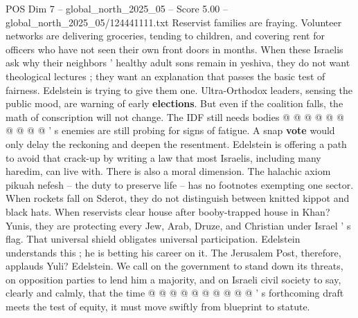 \begin{textsample}{POS Dim 7 – global\_north\_2025\_05 – Score 5.00 – global\_north\_2025\_05/124441111.txt}
Reservist families are fraying.
Volunteer networks are delivering groceries, tending to children, and covering rent for officers who have not seen their own front doors in months.
When these Israelis ask why their neighbors ' healthy adult sons remain in yeshiva, they do not want theological lectures ; they want an explanation that passes the basic test of fairness.
Edelstein is trying to give them one.
Ultra-Orthodox leaders, sensing the public mood, are warning of early \textbf{elections}.
But even if the coalition falls, the math of conscription will not change.
The IDF still needs bodies @ @ @ @ @ @ @ @ @ @ ' s enemies are still probing for signs of fatigue.
A snap \textbf{vote} would only delay the reckoning and deepen the resentment.
Edelstein is offering a path to avoid that crack-up by writing a law that most Israelis, including many haredim, can live with.
There is also a moral dimension.
The halachic axiom pikuah nefesh -- the duty to preserve life -- has no footnotes exempting one sector.
When rockets fall on Sderot, they do not distinguish between knitted kippot and black hats.
When reservists clear house after booby-trapped house in Khan?
Yunis, they are protecting every Jew, Arab, Druze, and Christian under Israel ' s flag.
That universal shield obligates universal participation.
Edelstein understands this ; he is betting his career on it.
The Jerusalem Post, therefore, applauds Yuli?
Edelstein.
We call on the government to stand down its threats, on opposition parties to lend him a majority, and on Israeli civil society to say, clearly and calmly, that the time @ @ @ @ @ @ @ @ @ @ ' s forthcoming draft meets the test of equity, it must move swiftly from blueprint to statute.

\end{textsample}
